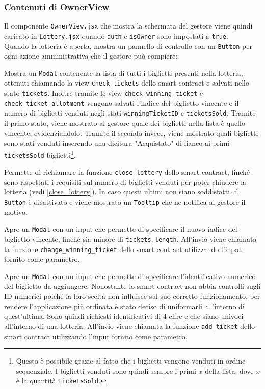 \documentclass[12pt,a4paper,openright,twoside]{report}
\begin{document}
\subsubsection{Contenuti di OwnerView}
Il componente \texttt{OwnerView.jsx} che mostra la schermata del gestore viene quindi caricato in \texttt{Lottery.jsx} quando \texttt{auth} e \texttt{isOwner} sono impostati a \texttt{true}.\\
Quando la lotteria è aperta, mostra un pannello di controllo con un \texttt{Button} per ogni azione amministrativa che il gestore può compiere:
\begin{description}[font=$\bullet$\:\:,leftmargin=\parindent,labelindent=\parindent]
    \item[Monitorare la lista dei biglietti] Mostra un \texttt{Modal} contenente la lista di tutti i biglietti presenti nella lotteria, ottenuti chiamando la view \texttt{check\_tickets} dello smart contract e salvati nello stato \texttt{tickets}. Inoltre tramite le view \texttt{check\_winning\_ticket} e \texttt{check\_ticket\_allotment} vengono salvati l'indice del biglietto vincente e il numero di biglietti venduti negli stati \texttt{winningTicketID} e \texttt{ticketsSold}. Tramite il primo stato, viene mostrato al gestore quale dei biglietti nella lista è quello vincente, evidenziandolo. Tramite il secondo invece, viene mostrato quali biglietti sono stati venduti inserendo una dicitura "Acquistato" di fianco ai primi \texttt{ticketsSold} biglietti\footnote{Questo è possibile grazie al fatto che i biglietti vengono venduti in ordine sequenziale. I biglietti venduti sono quindi sempre i primi \(x\) della lista, dove \(x\) è la quantità \texttt{ticketsSold}.}.
    \item[Chiudere la lotteria] Permette di richiamare la funzione \texttt{close\_lottery} dello smart contract, finché sono rispettati i requisiti sul numero di biglietti venduti per poter chiudere la lotteria (vedi \ref{close_lottery}). In caso questi ultimi non siano soddisfatti, il \texttt{Button} è disattivato e viene mostrato un \texttt{Tooltip} che ne notifica al gestore il motivo.
    \item[Modifica del biglietto vincente] Apre un \texttt{Modal} con un input che permette di specificare il nuovo indice del biglietto vincente, finché sia minore di \texttt{tickets.length}. All'invio viene chiamata la funzione \texttt{change\_winning\_ticket} dello smart contract utilizzando l'input fornito come parametro.
    \item[Aggiungere un biglietto] Apre un \texttt{Modal} con un input che permette di specificare l'identificativo numerico del biglietto da aggiungere. Nonostante lo smart contract non abbia controlli sugli ID numerici poiché la loro scelta non influisce sul suo corretto funzionamento, per rendere l'applicazione più ordinata è stato deciso di uniformarli all'interno di quest'ultima. Sono quindi richiesti identificativi di 4 cifre e che siano univoci all'interno di una lotteria. All'invio viene chiamata la funzione \texttt{add\_ticket} dello smart contract utilizzando l'input fornito come parametro.
\end{description}
\end{document}
